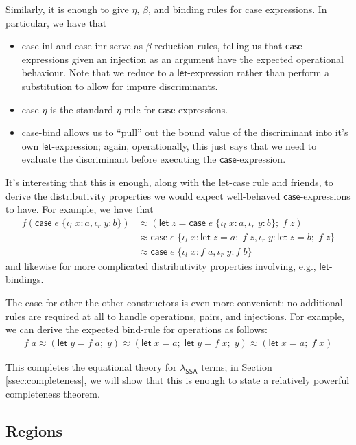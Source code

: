 \documentclass[acmsmall,screen,review]{acmart}
\newcommand{\ms}[1]{\ensuremath{\mathsf{#1}}}
\newcommand{\lto}{:}
\newcommand{\linl}[1]{\iota_l\;{#1}}
\newcommand{\linr}[1]{\iota_r\;{#1}}
\newcommand{\letexpr}[3]{\ensuremath{\ms{let}\;#1 = #2;\;#3}}
\newcommand{\caseexpr}[5]{\ms{case}\;#1\;\{\linl{#2} \lto #3, \linr{#4} \lto #5\}}
\newcommand{\teqv}{\approx}
\newcommand{\brle}[1]{{\scriptsize\textsf{#1}}}
\newcommand{\isotopessa}{\(\lambda_{\ms{SSA}}\)}
\begin{document}
Similarly, it is enough to give $\eta$, $\beta$, and binding rules for \brle{case} expressions. 
In particular, we have that
\begin{itemize}
  \item \brle{case-inl} and \brle{case-inr} serve as $\beta$-reduction rules, telling us that
  \ms{case}-expressions given an injection as an argument have the expected operational behaviour.
  Note that we reduce to a \ms{let}-expression rather than perform a substitution to allow for
  impure discriminants.
  \item \brle{case-$\eta$} is the standard $\eta$-rule for \ms{case}-expressions.
  \item \brle{case-bind} allows us to ``pull'' out the bound value of the discriminant into
  it's own \ms{let}-expression; again, operationally, this just says that we need to evaluate
  the discriminant before executing the \ms{case}-expression.
\end{itemize}
It's interesting that this is enough, along with the \brle{let-case} rule and friends, to derive the
distributivity properties we would expect well-behaved \ms{case}-expressions to have. For example,
we have that
\begin{align*}
  f(\caseexpr{e}{x}{a}{y}{b}) 
  &\teqv (\letexpr{z}{\caseexpr{e}{x}{a}{y}{b}}{f\;z}) \\
  &\teqv \caseexpr{e}{x}{\letexpr{z}{a}{f\;z}}{y}{\letexpr{z}{b}{f\;z}} \\
  &\teqv \caseexpr{e}{x}{f\;a}{y}{f\;b}
\end{align*}
and likewise for more complicated distributivity properties involving, e.g., \ms{let}-bindings.

The case for other the other constructors is even more convenient: no additional rules are required
at all to handle operations, pairs, and injections. For example, we can derive the expected
bind-rule for operations as follows:
\begin{align*}
  f\;a \teqv (\letexpr{y}{f\;a}{y})
  \teqv (\letexpr{x}{a}{\letexpr{y}{f\;x}{y}})
  \teqv (\letexpr{x}{a}{f\;x})
\end{align*}

This completes the equational theory for \isotopessa{} terms; in Section \ref{ssec:completeness}, we
will show that this is enough to state a relatively powerful completeness theorem.

\subsection{Regions}
\end{document}
